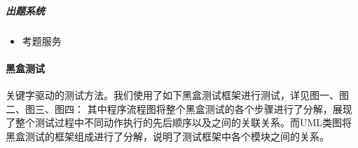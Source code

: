 \documentclass[hyperref, a4paper]{ctexart}
\providecommand{\tightlist}{%
  \setlength{\itemsep}{0pt}\setlength{\parskip}{0pt}}
\let\oldparagraph\paragraph
\renewcommand{\paragraph}[1]{\oldparagraph{#1}\mbox{}}
\let\oldsubparagraph\subparagraph
\renewcommand{\subparagraph}[1]{\oldsubparagraph{#1}\mbox{}}
\begin{document}
\hypertarget{ux51faux9898ux7cfbux7edf-2}{%
\subparagraph{出题系统}\label{ux51faux9898ux7cfbux7edf-2}}

\begin{itemize}
\tightlist
\item
  考题服务
\end{itemize}

\hypertarget{ux9ed1ux76d2ux6d4bux8bd5}{%
\paragraph{黑盒测试}\label{ux9ed1ux76d2ux6d4bux8bd5}}

关键字驱动的测试方法。我们使用了如下黑盒测试框架进行测试，详见图一、图二、图三、图四：
其中程序流程图将整个黑盒测试的各个步骤进行了分解，展现了整个测试过程中不同动作执行的先后顺序以及之间的关联关系。而UML类图将黑盒测试的框架组成进行了分解，说明了测试框架中各个模块之间的关系。
\end{document}

